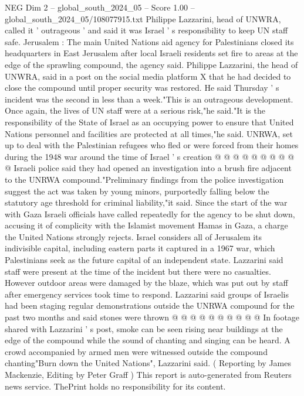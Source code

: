 \begin{textsample}{NEG Dim 2 – global\_south\_2024\_05 – Score 1.00 – global\_south\_2024\_05/108077915.txt}  \label{ex:f2_neg_219}
Philippe Lazzarini, head of UNWRA, called it ' outrageous ' and said it was Israel ' s responsibility to keep UN staff safe.
Jerusalem : The main United Nations aid agency for Palestinians closed its headquarters in East Jerusalem after local Israeli residents set fire to areas at the edge of the sprawling compound, the agency said.
Philippe Lazzarini, the head of UNWRA, said in a post on the social media platform X that he had decided to close the compound until proper security was restored.
He said Thursday ' s incident was the second in less than a week."This is an outrageous development.
Once again, the lives of UN staff were at a serious risk,"he said."It is the responsibility of the State of Israel as an occupying power to ensure that United Nations personnel and facilities are protected at all times,"he said.
UNRWA, set up to deal with the Palestinian refugees who fled or were forced from their homes during the 1948 war around the time of Israel ' s creation @ @ @ @ @ @ @ @ @ @ Israeli police said they had opened an investigation into a brush fire adjacent to the UNRWA compound."Preliminary findings from the police investigation suggest the act was taken by young minors, purportedly falling below the statutory age threshold for criminal liability,"it said.
Since the start of the war with Gaza Israeli officials have called repeatedly for the agency to be shut down, accusing it of complicity with the Islamist movement Hamas in Gaza, a charge the United Nations strongly rejects.
Israel considers all of Jerusalem its indivisible capital, including eastern parts it captured in a 1967 war, which Palestinians seek as the future capital of an independent state.
Lazzarini said staff were present at the time of the incident but there were no casualties.
However outdoor areas were damaged by the blaze, which was put out by staff after emergency services took time to respond.
Lazzarini said groups of Israelis had been staging regular demonstrations outside the UNRWA compound for the past two months and said stones were thrown @ @ @ @ @ @ @ @ @ @ In footage shared with Lazzarini ' s post, smoke can be seen rising near buildings at the edge of the compound while the sound of chanting and singing can be heard.
A crowd accompanied by armed men were witnessed outside the compound chanting"Burn down the United Nations", Lazzarini said. ( Reporting by James Mackenzie, Editing by Peter Graff ) This report is auto-generated from Reuters news service.
ThePrint holds no responsibility for its content.

\end{textsample}
